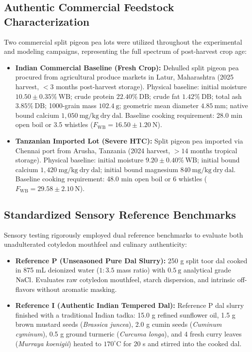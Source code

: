 \documentclass[10pt,a4paper]{article}
\begin{document}
\subsection{Authentic Commercial Feedstock Characterization}
Two commercial split pigeon pea lots were utilized throughout the experimental and modeling campaigns, representing the full spectrum of post-harvest crop age:
\begin{itemize}[leftmargin=1.5em]
    \item \textbf{Indian Commercial Baseline (Fresh Crop):} Dehulled split pigeon pea procured from agricultural produce markets in Latur, Maharashtra (2025 harvest, $< 3$ months post-harvest storage). Physical baseline: initial moisture $10.50 \pm 0.35\%\ \mathrm{WB}$; crude protein $22.40\%\ \mathrm{DB}$; crude fat $1.42\%\ \mathrm{DB}$; total ash $3.85\%\ \mathrm{DB}$; 1000-grain mass $102.4\ \mathrm{g}$; geometric mean diameter $4.85\ \mathrm{mm}$; native bound calcium $1,050\ \mathrm{mg/kg\ dry\ dal}$. Baseline cooking requirement: 28.0 min open boil or 3.5 whistles ($F_{\mathrm{WB}} = 16.50 \pm 1.20\ \mathrm{N}$).
    \item \textbf{Tanzanian Imported Lot (Severe HTC):} Split pigeon pea imported via Chennai port from Arusha, Tanzania (2024 harvest, $> 14$ months tropical storage). Physical baseline: initial moisture $9.20 \pm 0.40\%\ \mathrm{WB}$; initial bound calcium $1,420\ \mathrm{mg/kg\ dry\ dal}$; initial bound magnesium $840\ \mathrm{mg/kg\ dry\ dal}$. Baseline cooking requirement: 48.0 min open boil or 6 whistles ($F_{\mathrm{WB}} = 29.58 \pm 2.10\ \mathrm{N}$).
\end{itemize}

\subsection{Standardized Sensory Reference Benchmarks}
Sensory testing rigorously employed dual reference benchmarks to evaluate both unadulterated cotyledon mouthfeel and culinary authenticity:
\begin{itemize}[leftmargin=1.5em]
    \item \textbf{Reference P (Unseasoned Pure Dal Slurry):} 250 g split toor dal cooked in 875 mL deionized water ($1:3.5$ mass ratio) with $0.5\ \mathrm{g}$ analytical grade $\ce{NaCl}$. Evaluates raw cotyledon mouthfeel, starch dispersion, and intrinsic off-flavors without aromatic masking.
    \item \textbf{Reference I (Authentic Indian Tempered Dal):} Reference P dal slurry finished with a traditional Indian tadka: 15.0 g refined sunflower oil, 1.5 g brown mustard seeds (\textit{Brassica juncea}), 2.0 g cumin seeds (\textit{Cuminum cyminum}), 0.5 g ground turmeric (\textit{Curcuma longa}), and 4 fresh curry leaves (\textit{Murraya koenigii}) heated to $170^\circ\mathrm{C}$ for 20 s and stirred into the cooked dal.
\end{itemize}
\end{document}
